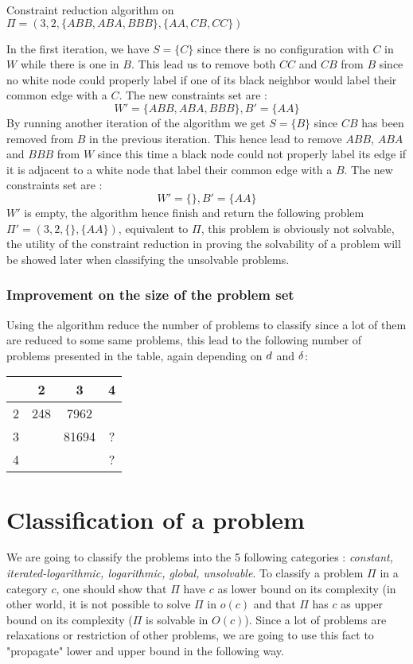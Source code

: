 \begin{exmp} Constraint reduction algorithm on $\Pi = (3, 2, \{ABB, ABA, BBB\}, \{AA, CB, CC\})$

In the first iteration, we have $S = \{C\}$ since there is no configuration with $C$ in $W$ while there is one in $B$.
This lead us to remove both $CC$ and $CB$ from $B$ since no white node could properly label if one of its black neighbor would label their common edge with a $C$.
The new constraints set are :
$$W' = \{ABB, ABA, BBB\}, B' = \{AA\}$$
By running another iteration of the algorithm we get $S = \{B\}$ since $CB$ has been removed from $B$ in the previous iteration.
This hence lead to remove $ABB$, $ABA$ and $BBB$ from $W$ since this time a black node could not properly label its edge if it is adjacent to a white node that label their common edge with a $B$.
The new constraints set are :
$$W' = \{\}, B' = \{AA\}$$
$W'$ is empty, the algorithm hence finish and return the following problem $\Pi' = (3, 2,\{\}, \{AA\})$, equivalent to $\Pi$, this problem is obviously not solvable, the utility of the constraint reduction in proving the solvability of a problem will be showed later when classifying the unsolvable problems.
\end{exmp}
\subsubsection{Improvement on the size of the problem set}

Using the algorithm reduce the number of problems to classify since a lot of them are reduced to some same problems, this lead to the following number of problems presented in the table, again depending on $\wdd$ and $\bdd$:
\begin{center}
\begin{tabular}{ | c | c | c | c |}
 \hline
 \diagbox{$\wdd$}{$\bdd$} & 2 & 3 & 4 \\ 
 \hline
 2 & 248 & 7962 & \\
 \hline
 3 &  & 81694 & ?\\
 \hline
 4 &  &  &  ?\\
\hline
\end{tabular}
\end{center}


\section{Classification of a problem}
We are going to classify the problems into the 5 following categories : \textit{constant, iterated-logarithmic, logarithmic, global, unsolvable}. To classify a problem $\Pi$ in a category $c$, one should show that $\Pi$  have $c$ as lower bound on its complexity (in other world, it is not possible to solve $\Pi$ in $o(c)$ and that $\Pi$ has $c$ as upper bound on its complexity ($\Pi$ is solvable in $O(c)$). Since a lot of problems are relaxations or restriction of other problems, we are going to use this fact to "propagate" lower and upper bound in the following way.
